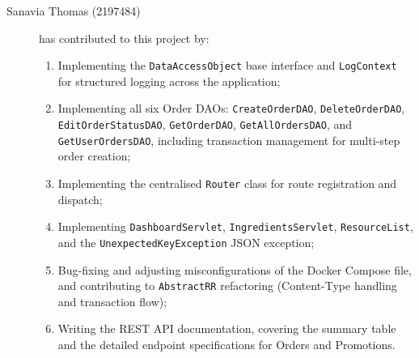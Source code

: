 \begin{description}
	\item[Sanavia Thomas (2197484)] has contributed to this project by:
    \begin{enumerate}
        \item Implementing the \texttt{DataAccessObject} base interface and \texttt{LogContext} for structured logging across the application;
        \item Implementing all six Order DAOs: \texttt{CreateOrderDAO}, \texttt{DeleteOrderDAO}, \texttt{EditOrderStatusDAO}, \texttt{GetOrderDAO}, \texttt{GetAllOrdersDAO}, and \texttt{GetUserOrdersDAO}, including transaction management for multi-step order creation;
        \item Implementing the centralised \texttt{Router} class for route registration and dispatch;
        \item Implementing \texttt{DashboardServlet}, \texttt{IngredientsServlet}, \texttt{ResourceList}, and the \texttt{UnexpectedKeyException} JSON exception;
        \item Bug-fixing and adjusting misconfigurations of the Docker Compose file, and contributing to \texttt{AbstractRR} refactoring (Content-Type handling and transaction flow);
        \item Writing the REST API documentation, covering the summary table and the detailed endpoint specifications for Orders and Promotions.
    \end{enumerate}
\end{description}
